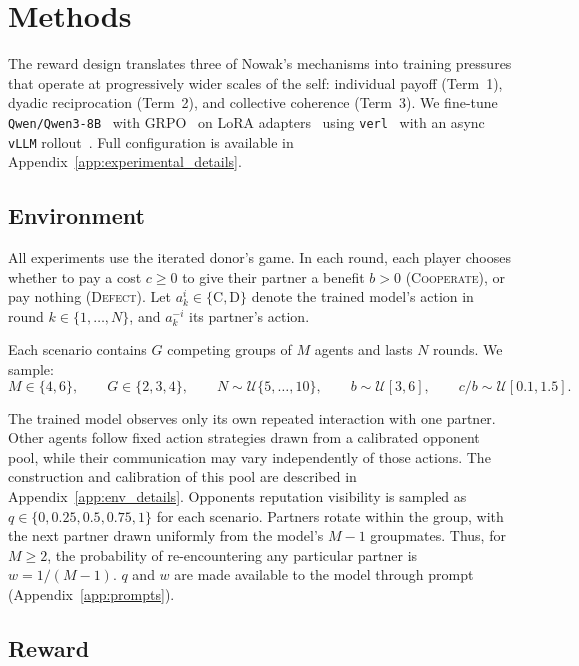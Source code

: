\documentclass{article}
\begin{document}
\section{Methods}
\label{sec:methods}

The reward design translates three of Nowak's mechanisms into training
pressures that operate at progressively wider scales of the self: individual
payoff (Term~1), dyadic reciprocation (Term~2), and collective coherence
(Term~3).  We fine-tune \texttt{Qwen/Qwen3-8B}~\citep{qwen3} with GRPO~\citep{deepseekmath} on LoRA adapters~\citep{hu2022lora} using \texttt{verl}~\citep{sheng2024verl} with an async \texttt{vLLM} rollout~\citep{kwon2023vllm}. Full configuration is available in Appendix~\ref{app:experimental_details}.

\subsection{Environment}
\label{subsec:env}

All experiments use the iterated donor's game. In each round, each player
chooses whether to pay a cost $c \geq 0$ to give their partner a benefit
$b > 0$ (\textsc{Cooperate}), or pay nothing (\textsc{Defect}). Let
$a_k^i \in \{\mathrm{C},\mathrm{D}\}$ denote the trained model's action in
round $k \in \{1,\dots,N\}$, and $a_k^{-i}$ its partner's action.

Each scenario contains $G$ competing groups of $M$ agents and lasts $N$
rounds. We sample:
\[
M \in \{4,6\},\qquad
G \in \{2,3,4\},\qquad
N \sim \mathcal{U}\{5,\dots,10\},\qquad
b \sim \mathcal{U}[3,6],\qquad
c/b \sim \mathcal{U}[0.1,1.5].
\]

The trained model observes only its own repeated interaction with one partner.
Other agents follow fixed action strategies drawn from a calibrated opponent
pool, while their communication may vary independently of those actions.
The construction and calibration of this pool are described in
Appendix~\ref{app:env_details}. Opponents reputation visibility is sampled as
$q \in \{0,0.25,0.5,0.75,1\}$ for each scenario. Partners rotate within the group, with the next partner drawn uniformly from the model's $M-1$ groupmates. Thus, for $M\geq2$, the probability of re-encountering any particular partner is $w=1/(M-1)$. $q$ and $w$ are made available to the model through prompt (Appendix~\ref{app:prompts}).

\subsection{Reward}
\label{subsec:reward}
\end{document}
